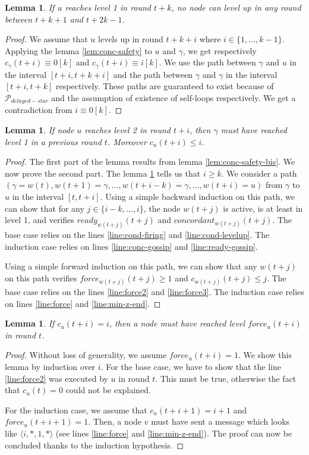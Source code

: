 \documentclass[11pt,letterpaper]{article}
\newtheorem{lem}[thm]{Lemma}
\newcommand{\cent}{\gamma}
\begin{document}
\begin{lem} \label{lem:no-close-level2}
	If $u$ reaches level 1 in round $t+k$, no node can level up in any round between $t+k+1$ and $t+2k-1$.
\end{lem}
\begin{proof}
	We assume that $u$ levels up in round $t+k+i$ where $i \in \{1, \dots, k-1\}$.
	Applying the lemma \ref{lem:conc-safety} to $u$ and $\cent$, we get respectively $c_\cent(t+i) \equiv 0 [k]$ and $c_\cent(t+i) \equiv i [k]$.
	We use the path between $\cent$ and $u$ in the interval $[t+i,t+k+i]$ and the path between $\cent$ and $\cent$ in the interval $[t+i,t+k]$ respectively.
	These paths are guaranteed to exist because of $\mathcal{P}_{delayed-star}$ and the assumption of existence of self-loops respectively.
	We get a contradiction from $i \equiv 0 [k]$.
\end{proof}

\begin{lem} \label{lem:ready-safety}
	If node $u$ reaches level 2 in round $t+i$, then $\cent$ must have reached level 1 in a previous round $t$. Moreover $c_u(t+i) \leq i$.
\end{lem}
\begin{proof}
	The first part of the lemma results from lemma \ref{lem:conc-safety-bis}. We now prove the second part.
	The lemma \ref{lem:no-close-level2} tells us that $i \geq k$.
	We consider a path $(\cent = w(t), w(t+1) = \cent, \dots, w(t+i-k) = \cent, \dots, w(t+i) = u)$ from $\cent$ to $u$ in the interval $[t, t+i]$. 
	Using a simple backward induction on this path, we can show that for any $j \in \{i-k, \dots, i\}$,
	the node $w(t+j)$ is active, is at least in level 1, and verifies $ready_{w(t+j)}(t+j)$ and $concordant_{w(t+j)}(t+j)$.
	The base case relies on the lines \ref{line:cond-firing} and \ref{line:cond-levelup}. The induction case relies on lines \ref{line:conc-gossip} and \ref{line:ready-gossip}.

	Using a simple forward induction on this path, we can show that any $w(t+j)$ on this path verifies $force_{w(t+j)}(t+j) \geq 1$ and $c_{w(t+j)}(t+j) \leq j$.
	The base case relies on the lines \ref{line:force2} and \ref{line:force3}. The induction case relies on lines \ref{line:force} and \ref{line:min-z-end}.
\end{proof}

\begin{lem} \label{lem:safety-force}
	If $c_u(t+i) = i$, then a node must have reached level $force_u(t+i)$ in round $t$.
\end{lem}
\begin{proof}
	Without loss of generality, we assume $force_u(t+i) = 1$.
	We show this lemma by induction over $i$.
	For the base case, we have to show that the line \ref{line:force2} was executed by $u$ in round $t$.
	This must be true, otherwise the fact that $c_u(t) = 0$ could not be explained.

	For the induction case, we assume that $c_u(t+i+1) = i+1$ and $force_u(t+i+1) = 1$.
	Then, a node $v$ must have sent a message which looks like $\langle i, *, 1, * \rangle$ (see lines \ref{line:force} and \ref{line:min-z-end}).
	The proof can now be concluded thanks to the induction hypothesis.
\end{proof}
\end{document}
